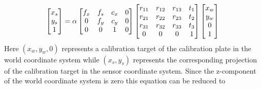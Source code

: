 \documentclass[12pt,oneside,openany,a4paper, %
english, %
masters-t, goldenblock]{usthesis}
\begin{document}
\begin{equation}
  \begin{bmatrix}
  x_s \\
  y_s \\
  1
  \end{bmatrix} = 
  \alpha
  \begin{bmatrix}
  f_x & f_s & c_x & 0\\
  0 & f_y & c_y & 0\\
  0 & 0 & 1 & 0
  \end{bmatrix}
  \begin{bmatrix}
  r_{11} & r_{12} & r_{13} & t_1 \\
  r_{21} & r_{22} & r_{23} & t_2 \\
  r_{31} & r_{32} & r_{33} & t_3 \\
  0 & 0 & 0 & 1
  \end{bmatrix}
  \begin{bmatrix}
  x_w \\
  y_w \\
  0 \\
  1
  \end{bmatrix} \\
\end{equation}
Here $(x_w, y_w, 0)$ represents a calibration target of the calibration plate in the world coordinate system while $(x_s, y_s)$ represents the corresponding projection of the calibration target in the sensor coordinate system. Since the z-component of the world coordinate system is zero this equation can be reduced to 
\end{document}
